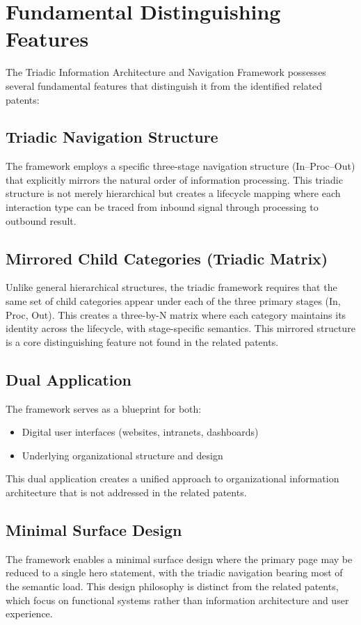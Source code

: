 \documentclass[11pt,a4paper]{article}
\begin{document}
\section*{Fundamental Distinguishing Features}

The Triadic Information Architecture and Navigation Framework possesses several fundamental features that distinguish it from the identified related patents:

\subsection*{Triadic Navigation Structure}
The framework employs a specific three-stage navigation structure (In--Proc--Out) that explicitly mirrors the natural order of information processing. This triadic structure is not merely hierarchical but creates a lifecycle mapping where each interaction type can be traced from inbound signal through processing to outbound result.

\subsection*{Mirrored Child Categories (Triadic Matrix)}
Unlike general hierarchical structures, the triadic framework requires that the same set of child categories appear under each of the three primary stages (In, Proc, Out). This creates a three-by-N matrix where each category maintains its identity across the lifecycle, with stage-specific semantics. This mirrored structure is a core distinguishing feature not found in the related patents.

\subsection*{Dual Application}
The framework serves as a blueprint for both:
\begin{itemize}[noitemsep]
  \item Digital user interfaces (websites, intranets, dashboards)
  \item Underlying organizational structure and design
\end{itemize}
This dual application creates a unified approach to organizational information architecture that is not addressed in the related patents.

\subsection*{Minimal Surface Design}
The framework enables a minimal surface design where the primary page may be reduced to a single hero statement, with the triadic navigation bearing most of the semantic load. This design philosophy is distinct from the related patents, which focus on functional systems rather than information architecture and user experience.
\end{document}
